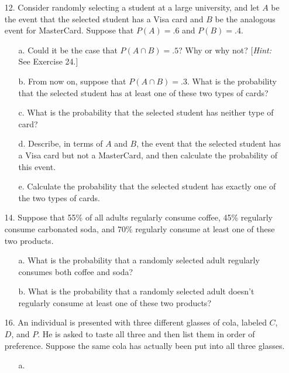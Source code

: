 \documentclass[letterpaper,12pt]{article}
\begin{document}
\maketitle

\begin{enumerate}
  \item[12.]
    Consider randomly selecting a student at a large university, and let $A$ be the event that the selected student has a Visa card and $B$ be the analogous event for MasterCard. Suppose that $P(A) = .6$ and $P(B) = .4$.
    \begin{enumerate}
      \item[a.]
        Could it be the case that $P(A \cap B) = .5$? Why or why not? [\textit{Hint:} See Exercise 24.]
      \item[b.]
        From now on, suppose that $P(A \cap B) = .3$. What is the probability that the selected student has at least one of these two types of cards?
      \item[c.]
        What is the probability that the selected student has neither type of card?
      \item[d.]
        Describe, in terms of $A$ and $B$, the event that the selected student has a Visa card but not a MasterCard, and then calculate the probability of this event.
      \item[e.]
        Calculate the probability that the selected student has exactly one of the two types of cards.
    \end{enumerate}
  \item[14.]
    Suppose that 55\% of all adults regularly consume coffee, 45\% regularly consume carbonated soda, and 70\% regularly consume at least one of these two products.
    \begin{enumerate}
      \item[a.]
        What is the probability that a randomly selected adult regularly consumes both coffee and soda?
      \item[b.]
        What is the probability that a randomly selected adult doesn’t regularly consume at least one of these two products?
    \end{enumerate}
  \item[16.]
  An individual is presented with three different glasses of cola, labeled $C$, $D$, and $P$. He is asked to taste all three and then list them in order of preference. Suppose the same cola has actually been put into all three glasses.
  \begin{enumerate}
      \item[a.]

\end{enumerate}
\end{enumerate}
\end{document}
